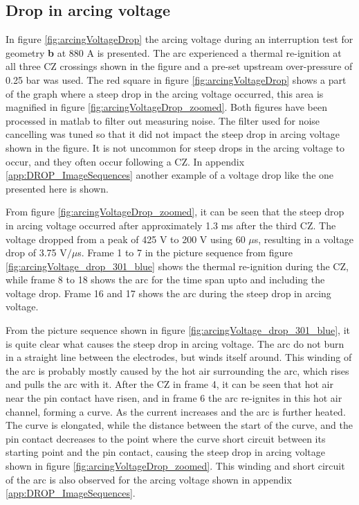 \documentclass[10pt,b5paper,twoside]{article}
\begin{document}
\newpage
\subsection{Drop in arcing voltage} \label{sec:results_drop_arcing_voltage}

In figure \ref{fig:arcingVoltageDrop} the arcing voltage during an interruption test for geometry \textbf{b} at 880 A is presented. The arc experienced a thermal re-ignition at all three CZ crossings shown in the figure and a pre-set upstream over-pressure of 0.25 bar was used. The red square in figure \ref{fig:arcingVoltageDrop} shows a part of the graph where a steep drop in the arcing voltage occurred, this area is magnified in figure \ref{fig:arcingVoltageDrop_zoomed}. Both figures have been processed in matlab to filter out measuring noise. The filter used for noise cancelling was tuned so that it did not impact the steep drop in arcing voltage shown in the figure. It is not uncommon for steep drops in the arcing voltage to occur, and they often occur following a CZ. In appendix \ref{app:DROP_ImageSequences} another example of a voltage drop like the one presented here is shown. 

From figure \ref{fig:arcingVoltageDrop_zoomed}, it can be seen that the steep drop in arcing voltage occurred after approximately 1.3 ms after the third CZ. The voltage dropped from a peak of 425 V to 200 V using 60 $\mu$s, resulting in a voltage drop of 3.75 V$/  \mu$s. Frame 1 to 7 in the picture sequence from figure \ref{fig:arcingVoltage_drop_301_blue} shows the thermal re-ignition during the CZ, while frame 8 to 18 shows the arc for the time span upto and including the voltage drop. Frame 16 and 17 shows the arc during the steep drop in arcing voltage. 

From the picture sequence shown in figure \ref{fig:arcingVoltage_drop_301_blue}, it is quite clear what causes the steep drop in arcing voltage. The arc do not burn in a straight line between the electrodes, but winds itself around. This winding of the arc is probably mostly caused by the hot air surrounding the arc, which rises and pulls the arc with it. After the CZ in frame 4, it can be seen that hot air near the pin contact have risen, and in frame 6 the arc re-ignites in this hot air channel, forming a curve. As the current increases and the arc is further heated. The curve is elongated, while the distance between the start of the curve, and the pin contact decreases to the point where the curve short circuit between its starting point and the pin contact, causing the steep drop in arcing voltage shown in figure \ref{fig:arcingVoltageDrop_zoomed}. This winding and short circuit of the arc is also observed for the arcing voltage shown in appendix \ref{app:DROP_ImageSequences}.
\end{document}
